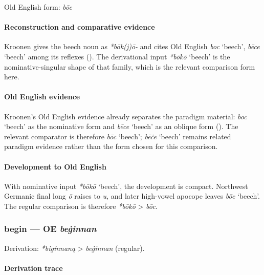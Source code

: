 \documentclass[
  british,
  a4paper,
]{article}
\providecommand{\Recon}[1]{\emph{*#1}}
\begin{document}
Old English form: \emph{bōc}

\paragraph{Reconstruction and comparative
evidence}\label{reconstruction-and-comparative-evidence-3}

Kroonen gives the beech noun as \emph{*bōk(j)ō-} and cites Old English
\emph{boc} `beech', {\emph{bēce}} `beech' among its reflexes
(). The derivational input
\Recon{bōkō} `beech' is the nominative-singular shape of that family,
which is the relevant comparison form here.

\paragraph{Old English evidence}\label{old-english-evidence-3}

Kroonen's Old English evidence already separates the paradigm material:
\emph{boc} `beech' as the nominative form and {\emph{bēce}} `beech' as
an oblique form (). The relevant
comparator is therefore \emph{bōc} `beech'; {\emph{bēċe}} `beech'
remains related paradigm evidence rather than the form chosen for this
comparison.

\paragraph{Development to Old
English}\label{development-to-old-english-3}

With nominative input \Recon{bōkō} `beech', the development is compact.
Northwest Germanic final long \emph{ō} raises to \emph{u}, and later
high-vowel apocope leaves \emph{bōc} `beech'. The regular comparison is
therefore \emph{*bōkō} \textgreater{} \emph{bōc}.

\subsubsection{\texorpdfstring{begin --- OE
\emph{beġinnan}}{begin --- OE beġinnan}}\label{begin-oe-beux121innan}

Derivation: \emph{*bigínnaną} \textgreater{} \emph{beġinnan} (regular).

\paragraph{Derivation trace}\label{derivation-trace-4}
\end{document}
